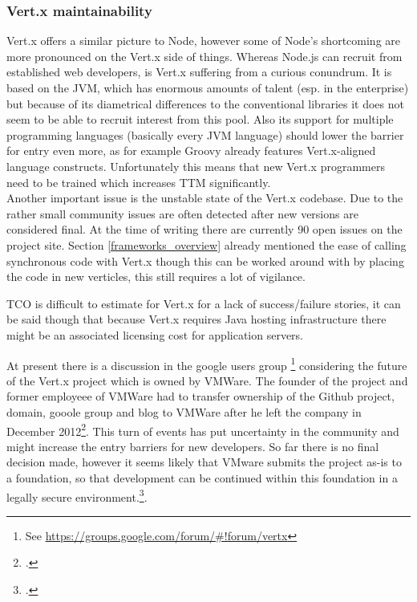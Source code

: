 \subsubsection{Vert.x maintainability}
\label{vertx_maintainability}
Vert.x offers a similar picture to Node, however some of Node's shortcoming are
more pronounced on the Vert.x side of things. Whereas Node.js can recruit from
established web developers, is Vert.x suffering from a curious conundrum. It is
based on the JVM, which has enormous amounts of talent (esp. in the enterprise)
but because of its diametrical differences to the conventional libraries it does
not seem to be able to recruit interest from this pool. Also its support for
multiple programming languages (basically every JVM language) should lower the
barrier for entry even more, as for example Groovy already features
Vert.x-aligned language constructs. Unfortunately this means that new Vert.x
programmers need to be trained which increases TTM significantly.\\
Another important issue is the unstable state of the Vert.x codebase. Due to the
rather small community issues are often detected after new versions are considered final.
At the time of writing there are currently 90 open issues on the project site.
Section \ref{frameworks_overview} already mentioned the ease of calling synchronous code with Vert.x though this
can be worked around with by placing the code in new verticles, this still
requires a lot of vigilance.

TCO is difficult to estimate for Vert.x for a lack of success/failure stories,
it can be said though that because Vert.x requires Java hosting infrastructure
there might be an associated licensing cost for application servers.

At present there is a discussion in the google users group
\footnote{See \url{https://groups.google.com/forum/\#!forum/vertx}} considering the future of
the Vert.x project which is owned by VMWare. The founder of the project and
former employeee of VMWare had to transfer ownership of the Github project,
domain, gooole group and blog to VMWare after he left the company in December
2012\footcite[Cf.][]{Vertx_announcement_2013}. This turn of events has put
uncertainty in the community and might increase the entry barriers for new
developers. So far there is no final decision made, however it seems likely that VMware
submits the project as-is to a foundation, so that development can be continued
within this foundation in a legally secure environment.\footcite[Cf.][]{Vertx_future_2013}.

